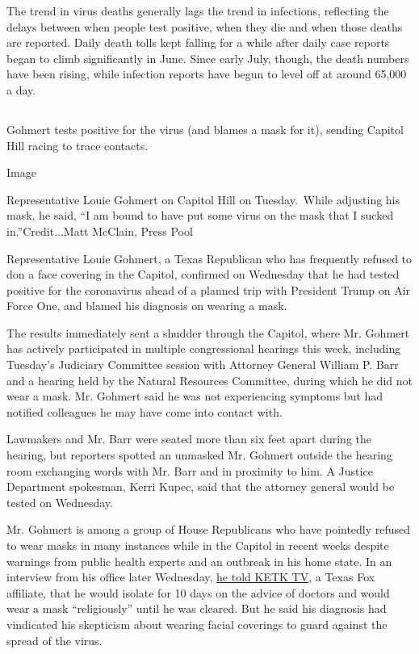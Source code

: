 The trend in virus deaths generally lags the trend in infections,
reflecting the delays between when people test positive, when they die
and when those deaths are reported. Daily death tolls kept falling for a
while after daily case reports began to climb significantly in June.
Since early July, though, the death numbers have been rising, while
infection reports have begun to level off at around 65,000 a day.

\hypertarget{-1}{%
\subsection{}\label{-1}}

Gohmert tests positive for the virus (and blames a mask for it), sending
Capitol Hill racing to trace contacts.

Image

Representative Louie Gohmert on Capitol Hill on Tuesday.~While adjusting
his mask, he said, ``I am bound to have put some virus on the mask that
I sucked in.''Credit...Matt McClain, Press Pool

Representative Louie Gohmert, a Texas Republican who has frequently
refused to don a face covering in the Capitol, confirmed on Wednesday
that he had tested positive for the coronavirus ahead of a planned trip
with President Trump on Air Force One, and blamed his diagnosis on
wearing a mask.

The results immediately sent a shudder through the Capitol, where Mr.
Gohmert has actively participated in multiple congressional hearings
this week, including Tuesday's Judiciary Committee session with Attorney
General William P. Barr and a hearing held by the Natural Resources
Committee, during which he did not wear a mask. Mr. Gohmert said he was
not experiencing symptoms but had notified colleagues he may have come
into contact with.

Lawmakers and Mr. Barr were seated more than six feet apart during the
hearing, but reporters spotted an unmasked Mr. Gohmert outside the
hearing room exchanging words with Mr. Barr and in proximity to him. A
Justice Department spokesman, Kerri Kupec, said that the attorney
general would be tested on Wednesday.

Mr. Gohmert is among a group of House Republicans who have pointedly
refused to wear masks in many instances while in the Capitol in recent
weeks despite warnings from public health experts and an outbreak in his
home state. In an interview from his office later Wednesday,
\href{https://www.easttexasmatters.com/news/local-news/watch-now-gohmert-to-isolate-for-next-10-days-still-believes-in-personal-freedom-for-wearing-masks/}{he
told KETK TV}, a Texas Fox affiliate, that he would isolate for 10 days
on the advice of doctors and would wear a mask ``religiously'' until he
was cleared. But he said his diagnosis had vindicated his skepticism
about wearing facial coverings to guard against the spread of the virus.

